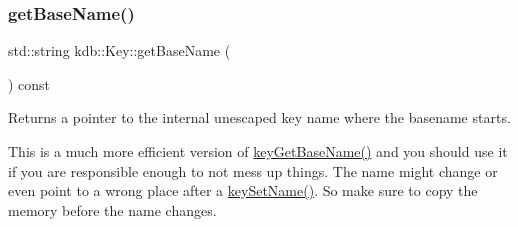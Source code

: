 \subsubsection{\texorpdfstring{get\+Base\+Name()}{getBaseName()}}
{\footnotesize\ttfamily std\+::string kdb\+::\+Key\+::get\+Base\+Name (\begin{DoxyParamCaption}{ }\end{DoxyParamCaption}) const\hspace{0.3cm}{\ttfamily [inline]}}



Returns a pointer to the internal unescaped key name where the {\ttfamily basename} starts. 

This is a much more efficient version of \hyperlink{group__keyname_ga0992d26bcfca767cb8e77053a483eb64}{key\+Get\+Base\+Name()} and you should use it if you are responsible enough to not mess up things. The name might change or even point to a wrong place after a \hyperlink{group__keyname_ga7699091610e7f3f43d2949514a4b35d9}{key\+Set\+Name()}. So make sure to copy the memory before the name changes.

